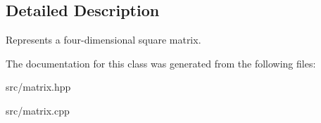 \subsection{Detailed Description}
Represents a four-\/dimensional square matrix. 

The documentation for this class was generated from the following files\+:\begin{DoxyCompactItemize}
\item 
src/matrix.\+hpp\item 
src/matrix.\+cpp\end{DoxyCompactItemize}
